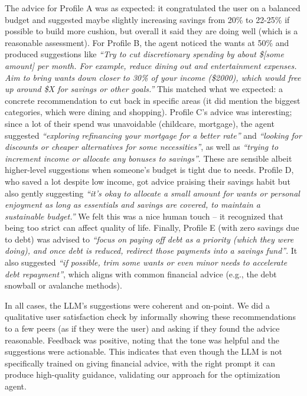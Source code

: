 \documentclass{scrartcl}
\begin{document}
The advice for Profile A was as expected: it congratulated the user on a balanced budget and suggested maybe slightly increasing savings from 20\% to 22-25\% if possible to build more cushion, but overall it said they are doing well (which is a reasonable assessment). For Profile B, the agent noticed the wants at 50\% and produced suggestions like \textit{“Try to cut discretionary spending by about \$[some amount] per month. For example, reduce dining out and entertainment expenses. Aim to bring wants down closer to 30\% of your income (\$2000), which would free up around \$\textit{X} for savings or other goals.”} This matched what we expected: a concrete recommendation to cut back in specific areas (it did mention the biggest categories, which were dining and shopping). Profile C's advice was interesting; since a lot of their spend was unavoidable (childcare, mortgage), the agent suggested \textit{“exploring refinancing your mortgage for a better rate”} and \textit{“looking for discounts or cheaper alternatives for some necessities”}, as well as \textit{“trying to increment income or allocate any bonuses to savings”}. These are sensible albeit higher-level suggestions when someone’s budget is tight due to needs. Profile D, who saved a lot despite low income, got advice praising their savings habit but also gently suggesting \textit{“it’s okay to allocate a small amount for wants or personal enjoyment as long as essentials and savings are covered, to maintain a sustainable budget.”} We felt this was a nice human touch – it recognized that being too strict can affect quality of life. Finally, Profile E (with zero savings due to debt) was advised to \textit{“focus on paying off debt as a priority (which they were doing), and once debt is reduced, redirect those payments into a savings fund”}. It also suggested \textit{“if possible, trim some wants or even minor needs to accelerate debt repayment”}, which aligns with common financial advice (e.g., the debt snowball or avalanche methods).

In all cases, the LLM’s suggestions were coherent and on-point. We did a qualitative user satisfaction check by informally showing these recommendations to a few peers (as if they were the user) and asking if they found the advice reasonable. Feedback was positive, noting that the tone was helpful and the suggestions were actionable. This indicates that even though the LLM is not specifically trained on giving financial advice, with the right prompt it can produce high-quality guidance, validating our approach for the optimization agent.
\end{document}
